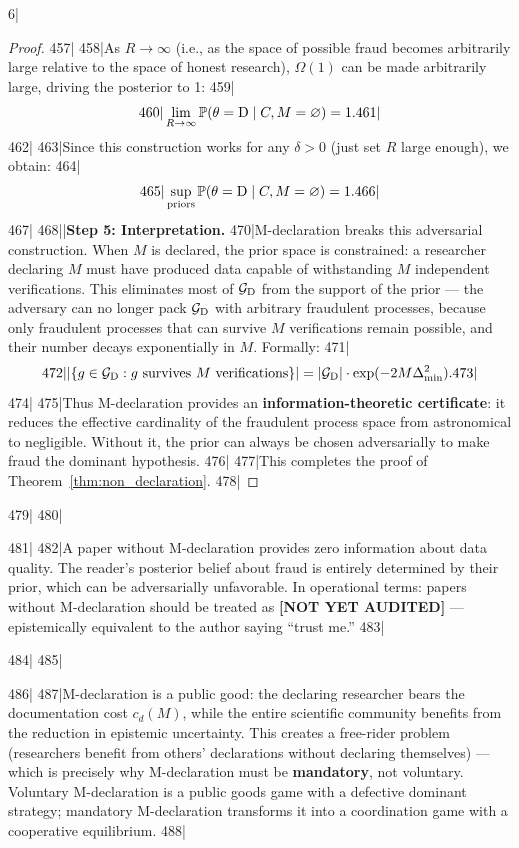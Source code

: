 6|\documentclass[12pt,a4paper]{article}
\begin{document}
\begin{proof}
457|
458|As $R \to \infty$ (i.e., as the space of possible fraud becomes arbitrarily large relative to the space of honest research), $\Omega(1)$ can be made arbitrarily large, driving the posterior to 1:
459|\begin{equation}
460|    \lim_{R \to \infty} \mathbb{P}(\theta = \text{D} \mid C, M = \varnothing) = 1.
461|\end{equation}
462|
463|Since this construction works for any $\delta > 0$ (just set $R$ large enough), we obtain:
464|\begin{equation}
465|    \sup_{\text{priors}} \mathbb{P}(\theta = \text{D} \mid C, M = \varnothing) = 1.
466|\end{equation}
467|
468||\noindent\textbf{Step 5: Interpretation.}
470|M-declaration breaks this adversarial construction. When $M$ is declared, the prior space is constrained: a researcher declaring $M$ must have produced data capable of withstanding $M$ independent verifications. This eliminates most of $\mathcal{G}_{\text{D}}$ from the support of the prior — the adversary can no longer pack $\mathcal{G}_{\text{D}}$ with arbitrary fraudulent processes, because only fraudulent processes that can survive $M$ verifications remain possible, and their number decays exponentially in $M$. Formally:
471|\begin{equation}
472|    |\{g \in \mathcal{G}_{\text{D}} : g \text{ survives } M \text{ verifications}\}| = |\mathcal{G}_{\text{D}}| \cdot \exp(-2M\Delta_{\min}^2).
473|\end{equation}
474|
475|Thus M-declaration provides an \textbf{information-theoretic certificate}: it reduces the effective cardinality of the fraudulent process space from astronomical to negligible. Without it, the prior can always be chosen adversarially to make fraud the dominant hypothesis.
476|
477|This completes the proof of Theorem~\ref{thm:non_declaration}.
478|\end{proof}
479|
480|\begin{corollary}[No M, No Trust]
481|\label{cor:no_trust}
482|A paper without M-declaration provides zero information about data quality. The reader's posterior belief about fraud is entirely determined by their prior, which can be adversarially unfavorable. In operational terms: papers without M-declaration should be treated as \textbf{[NOT YET AUDITED]} — epistemically equivalent to the author saying ``trust me.''
483|\end{corollary}
484|
485|\begin{corollary}
486|\label{cor:public_good}
487|M-declaration is a public good: the declaring researcher bears the documentation cost $c_d(M)$, while the entire scientific community benefits from the reduction in epistemic uncertainty. This creates a free-rider problem (researchers benefit from others' declarations without declaring themselves) — which is precisely why M-declaration must be \textbf{mandatory}, not voluntary. Voluntary M-declaration is a public goods game with a defective dominant strategy; mandatory M-declaration transforms it into a coordination game with a cooperative equilibrium.
488|\end{corollary}
\end{document}
